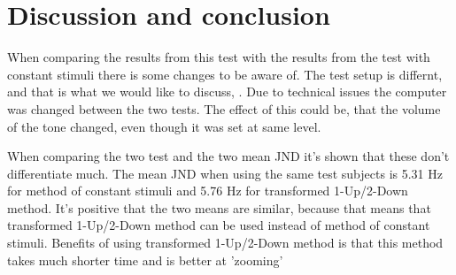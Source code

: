 \section*{Discussion and conclusion}
When comparing the results from this test with the results from the test with constant stimuli there is some changes to be aware of. The test setup is differnt, and that is what we would like to discuss, . Due to technical issues the computer was changed between the two tests. The effect of this could be, that the volume of the tone changed, even though it was set at same level. 

When comparing the two test and the two mean JND it's shown that these don't differentiate much. The mean JND when using the same test subjects is 5.31 Hz for method of constant stimuli and 5.76 Hz for transformed 1-Up/2-Down method. It's positive that the two means are similar, because that means that transformed 1-Up/2-Down method can be used instead of method of constant stimuli. Benefits of using transformed 1-Up/2-Down method is that this method takes much shorter time and is better at 'zooming' 








